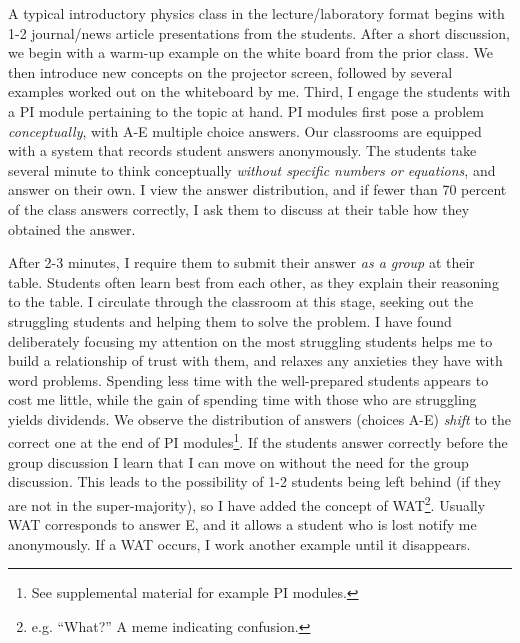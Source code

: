 \documentclass[../../../main.tex]{subfiles}
\begin{document}
A typical introductory physics class in the lecture/laboratory format begins with 1-2 journal/news article presentations from the students.  After a short discussion, we begin with a warm-up example on the white board from the prior class.  We then introduce new concepts on the projector screen, followed by several examples worked out on the whiteboard by me.  Third, I engage the students with a PI module pertaining to the topic at hand.  PI modules first pose a problem \textit{conceptually}, with A-E multiple choice answers.  Our classrooms are equipped with a system that records student answers anonymously.  The students take several minute to think conceptually \textit{without specific numbers or equations}, and answer on their own.  I view the answer distribution, and if fewer than 70 percent of the class answers correctly, I ask them to discuss at their table how they obtained the answer.  \\ \hspace{0.1cm}

After 2-3 minutes, I require them to submit their answer \textit{as a group} at their table.  Students often learn best from each other, as they explain their reasoning to the table.  I circulate through the classroom at this stage, seeking out the struggling students and helping them to solve the problem.  I have found deliberately focusing my attention on the most struggling students helps me to build a relationship of trust with them, and relaxes any anxieties they have with word problems.  Spending less time with the well-prepared students appears to cost me little, while the gain of spending time with those who are struggling yields dividends.  We observe the distribution of answers (choices A-E) \textit{shift} to the correct one at the end of PI modules\footnote{See supplemental material for example PI modules.}.  If the students answer correctly before the group discussion I learn that I can move on without the need for the group discussion.  This leads to the possibility of 1-2 students being left behind (if they are not in the super-majority), so I have added the concept of WAT\footnote{e.g. ``What?'' A meme indicating confusion.}.  Usually WAT corresponds to answer E, and it allows a student who is lost notify me anonymously.  If a WAT occurs, I work another example until it disappears.  \\ \hspace{0.1cm}
\end{document}
